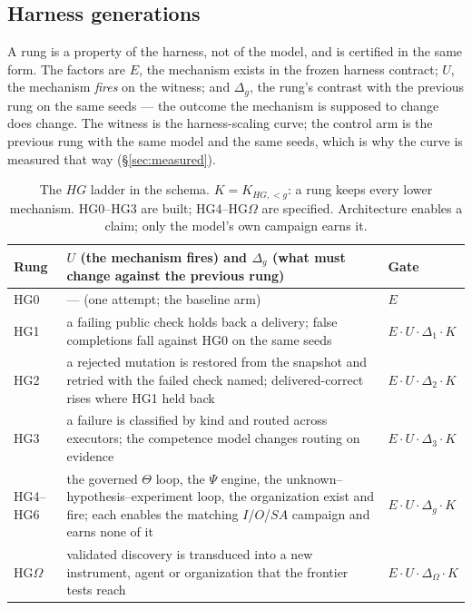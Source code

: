\documentclass[11pt]{article}
\theoremstyle{definition}
\newcommand{\Om}{\ensuremath{\Omega}}
\begin{document}
\subsection{Harness generations}
A rung is a property of the harness, not of the model, and is certified in the same form. The factors are $E$, the mechanism exists in the frozen harness contract; $U$, the mechanism \emph{fires} on the witness; and $\Delta_g$, the rung's contrast with the previous rung on the same seeds --- the outcome the mechanism is supposed to change does change. The witness is the harness-scaling curve; the control arm is the previous rung with the same model and the same seeds, which is why the curve is measured that way (\S\ref{sec:measured}).
\begin{table}[!htbp]
\centering\small
\begin{tabularx}{\textwidth}{@{}lYl@{}}
\toprule
Rung & $U$ (the mechanism fires) and $\Delta_g$ (what must change against the previous rung) & Gate \\
\midrule
HG0 & --- (one attempt; the baseline arm) & $E$ \\
HG1 & a failing public check holds back a delivery; false completions fall against HG0 on the same seeds & $E\cdot U\cdot\Delta_1\cdot K$ \\
HG2 & a rejected mutation is restored from the snapshot and retried with the failed check named; delivered-correct rises where HG1 held back & $E\cdot U\cdot\Delta_2\cdot K$ \\
HG3 & a failure is classified by kind and routed across executors; the competence model changes routing on evidence & $E\cdot U\cdot\Delta_3\cdot K$ \\
HG4--HG6 & the governed $\Theta$ loop, the $\Psi$ engine, the unknown--hypothesis--experiment loop, the organization exist and fire; each enables the matching $I$/$O$/$SA$ campaign and earns none of it & $E\cdot U\cdot\Delta_g\cdot K$ \\
HG\Om{} & validated discovery is transduced into a new instrument, agent or organization that the frontier tests reach & $E\cdot U\cdot\Delta_\Omega\cdot K$ \\
\bottomrule
\end{tabularx}
\caption{The $HG$ ladder in the schema. $K = K_{HG,<g}$: a rung keeps every lower mechanism. HG0--HG3 are built; HG4--HG\Om{} are specified. Architecture enables a claim; only the model's own campaign earns it.}
\label{tab:hgstyle}
\end{table}
\end{document}
